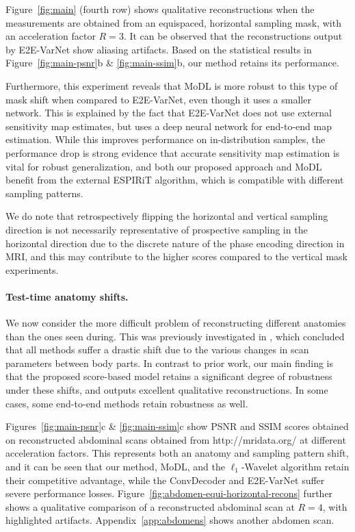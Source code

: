 Figure~\ref{fig:main} (fourth row) shows qualitative reconstructions when the measurements are obtained from an equispaced, horizontal sampling mask, with an acceleration factor $R=3$. It can be observed that the reconstructions output by E2E-VarNet show aliasing artifacts. Based on the statistical results in Figure~\ref{fig:main-psnr}b \& \ref{fig:main-ssim}b, our method retains its performance.

Furthermore, this experiment reveals that MoDL is more robust to this type of mask shift when compared to E2E-VarNet, even though it uses a smaller network. This is explained by the fact that E2E-VarNet does not use external sensitivity map estimates, but uses a deep neural network for end-to-end map estimation. While this improves performance on in-distribution samples, the performance drop is strong evidence that accurate sensitivity map estimation is vital for robust generalization, and both our proposed approach and MoDL benefit from the external ESPIRiT algorithm, which is compatible with different sampling patterns.

We do note that retrospectively flipping the horizontal and vertical sampling direction is not necessarily representative of prospective sampling in the horizontal direction due to the discrete nature of the phase encoding direction in MRI, and this may contribute to the higher scores compared to the vertical mask experiments.

\paragraph{Test-time anatomy shifts.}
We now consider the more difficult problem of reconstructing different anatomies than the ones seen during. This was previously investigated in \cite{darestani2021measuring}, which concluded that all methods suffer a drastic shift due to the various changes in scan parameters between body parts. In contrast to prior work, our main finding is that the proposed score-based model retains a significant degree of robustness under these shifts, and outputs excellent qualitative reconstructions. In some cases, some end-to-end methods retain robustness as well.

Figures~\ref{fig:main-psnr}c \& \ref{fig:main-ssim}c show PSNR and SSIM scores obtained on reconstructed abdominal scans obtained from http://mridata.org/ at different acceleration factors. This represents both an anatomy and sampling pattern shift, and it can be seen that our method, MoDL, and the $\ell_1$-Wavelet algorithm retain their competitive advantage, while the ConvDecoder and E2E-VarNet suffer severe performance losses. Figure~\ref{fig:abdomen-equi-horizontal-recons} further shows a qualitative comparison of a reconstructed abdominal scan at $R=4$, with highlighted artifacts. Appendix~\ref{app:abdomens} shows another abdomen scan.


